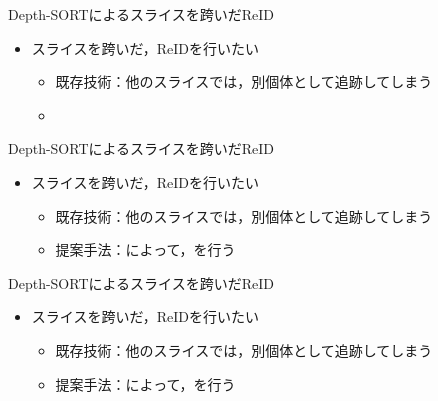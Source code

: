 \begin{frame}{Depth-SORTによるスライスを跨いだReID}
    \begin{itemize}
        \item スライスを跨いだ，ReIDを行いたい
        \begin{itemize}
            \item 既存技術：他のスライスでは，別個体として追跡してしまう
            \item[\phantom{}] 
        \end{itemize}
    \end{itemize}
\end{frame}
\begin{frame}[noframenumbering]{Depth-SORTによるスライスを跨いだReID}
    \begin{itemize}
        \item スライスを跨いだ，ReIDを行いたい
        \begin{itemize}
            \item 既存技術：他のスライスでは，別個体として追跡してしまう
            \item[\red{$\blacktriangleright$}] 提案手法：によって，を行う
        \end{itemize}
    \end{itemize}
\end{frame}
\begin{frame}[noframenumbering]{Depth-SORTによるスライスを跨いだReID}
    \begin{itemize}
        \item スライスを跨いだ，ReIDを行いたい
        \begin{itemize}
            \item 既存技術：他のスライスでは，別個体として追跡してしまう
            \item[\red{$\blacktriangleright$}] 提案手法：によって，を行う
        \end{itemize}
    \end{itemize}
\end{frame}
